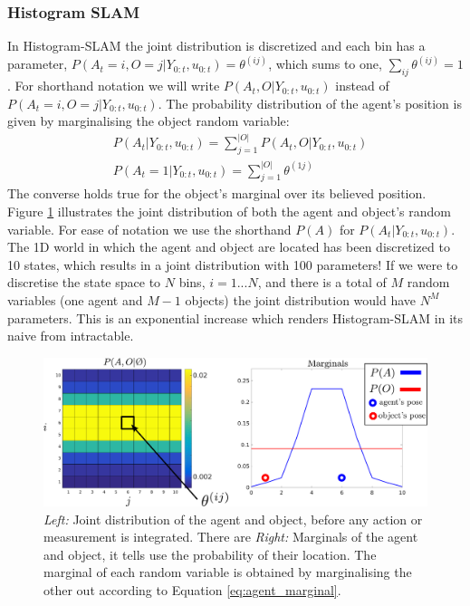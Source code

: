 \subsubsection{Histogram SLAM}\label{sec:Discrete}

In Histogram-SLAM the joint distribution is discretized and each bin has a parameter, 
$P(A_t=i,O=j|Y_{0:t},u_{0:t}) = \theta^{(ij)}$, which sums to one, $\sum_{ij} \theta^{(ij)} = 1$. 
For shorthand notation we will write $P(A_t,O|Y_{0:t},u_{0:t})$ instead of $P(A_t=i,O=j|Y_{0:t},u_{0:t})$.
The probability distribution of the agent's position is given by marginalising the object random variable:
\begin{align}
 &P(A_t|Y_{0:t},u_{0:t})    = \sum\limits_{j=1}^{|O|} P(A_t,O|Y_{0:t},u_{0:t}) \label{eq:agent_marginal} \\
 &P(A_t=1|Y_{0:t},u_{0:t})  = \sum\limits_{j=1}^{|O|} \theta^{(1j)}
\end{align}
The converse holds true for the object's marginal over its believed position. Figure \ref{fig:histogram_joint} illustrates 
the joint distribution of both the agent and object's random variable. For ease of notation we use the shorthand $P(A)$
for $P(A_t|Y_{0:t},u_{0:t})$. The 1D world in which the agent and object are located has been discretized to 10 states,
which results in a joint distribution with 100 parameters!
If we were to discretise the state space to $N$ bins, $i=1...N$, and there is a total of $M$ random variables (one agent and $M-1$ objects)
the joint distribution would have $N^{M}$ parameters. This is an exponential increase which renders Histogram-SLAM in its naive from 
intractable.

\begin{figure}
 \centering
 \includegraphics[width=\textwidth]{./ch5-MLMF/Figures/explenation/hist_SLAM.pdf}
 \caption{\textit{Left:} Joint distribution of the agent and object, before any action or measurement is integrated. There are 
 \textit{Right:} Marginals of the agent and object, it tells use the probability of their location. The marginal of each 
 random variable is obtained by marginalising the other out according to Equation \ref{eq:agent_marginal}. }
 \label{fig:histogram_joint}
\end{figure}

